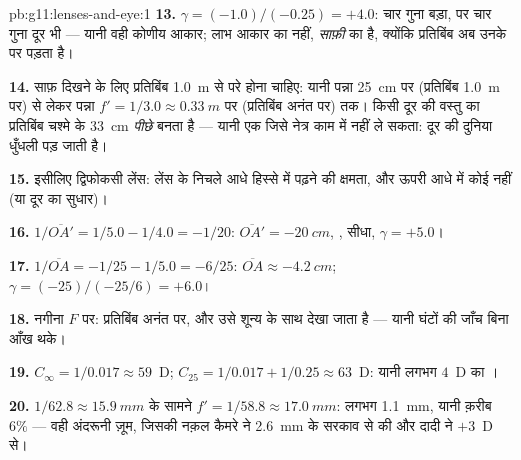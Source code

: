 \begin{solution}{pb:g11:lenses-and-eye:1}
\textbf{13.} $\gamma = (-1.0)/(-0.25) = +4.0$: चार गुना बड़ा, पर चार गुना दूर भी --- यानी वही
कोणीय आकार; लाभ आकार का नहीं, \emph{साफ़ी} का है, क्योंकि प्रतिबिंब अब
उनके  पर पड़ता है।

\textbf{14.} साफ़ दिखने के लिए प्रतिबिंब \qty{1.0}{m} से परे होना चाहिए:
यानी पन्ना \qty{25}{cm} पर (प्रतिबिंब \qty{1.0}{m} पर) से लेकर पन्ना $f' = 1/3.0 \approx \qty{0.33}{m}$ पर
(प्रतिबिंब अनंत पर) तक। किसी दूर की वस्तु का प्रतिबिंब चश्मे के \qty{33}{cm}
\emph{पीछे} बनता है --- यानी एक  जिसे नेत्र
काम में नहीं ले सकता: दूर की दुनिया धुँधली पड़ जाती है।

\textbf{15.} इसीलिए द्विफोकसी लेंस: लेंस के निचले आधे हिस्से में
पढ़ने की क्षमता, और ऊपरी आधे में कोई नहीं (या दूर का सुधार)।

\textbf{16.} $1/\overline{OA'} = 1/5.0 - 1/4.0 = -1/20$: $\overline{OA'} = \qty{-20}{cm}$, , सीधा, $\gamma = +5.0$।

\textbf{17.} $1/\overline{OA} = -1/25 - 1/5.0 = -6/25$: $\overline{OA} \approx \qty{-4.2}{cm}$; $\gamma = (-25)/(-25/6) = +6.0$।

\textbf{18.} नगीना $F$ पर: प्रतिबिंब अनंत पर, और उसे शून्य
 के साथ देखा जाता है --- यानी घंटों की जाँच बिना आँख थके।

\textbf{19.} $C_\infty = 1/0.017 \approx 59$~D; $C_{25} = 1/0.017 + 1/0.25 \approx 63$~D: यानी लगभग $4$~D का
।

\textbf{20.} $1/62.8 \approx \qty{15.9}{mm}$ के सामने $f' = 1/58.8 \approx \qty{17.0}{mm}$: लगभग \qty{1.1}{mm}, यानी क़रीब $6\%$
--- वही अंदरूनी ज़ूम, जिसकी नक़ल कैमरे ने \qty{2.6}{mm} के सरकाव से की और
दादी ने $+3$~D से।
\end{solution}
